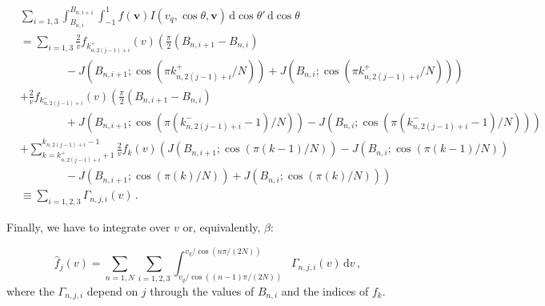 \begin{align*}
& \sum_{i = 1,3}\int_{B_{n,i}}^{B_{n,i+1}} \int_{-1}^{1} f(\textbf{v}) I(v_q, \cos\theta, \textbf{v}) \, \mathrm{d}\cos\theta' \, \mathrm{d}\cos\theta\\
&=\sum_{i = 1,3} \frac{2}{v} f_{k_{n,2(j-1)+i}^+}(v) \left( \frac{\pi}{2}(B_{n,i+1} - B_{n,i}) \right.\\
&\qquad\qquad - \left.J(B_{n,i+1}; \cos(\pi k_{n,2(j-1)+i}^{+}/N)) + J(B_{n,i}; \cos(\pi k_{n,2(j-1)+i}^{+}/N))\right)\\
&+ \frac{2}{v} f_{k_{n,2(j-1)+i}^-}(v) \left( \frac{\pi}{2}(B_{n,i+1} - B_{n,i})\right. \\
&\qquad\qquad + \left. J(B_{n,i+1}; \cos(\pi (k_{n,2(j-1)+i}^{-}-1)/N)) - J(B_{n,i}; \cos(\pi (k_{n,2(j-1)+i}^{-}-1)/N))\right)\\
&+ \sum_{k = k_{n,2(j-1)+i}^+ +1}^{k_{n,2(j-1)+i}-1} \frac{2}{v} f_{k}(v) \left( J(B_{n,i+1};\cos(\pi (k-1)/N)) - J(B_{n,i};\cos(\pi (k-1)/N))\right. \\
&\qquad\qquad - \left. J(B_{n,i+1};\cos(\pi (k)/N)) + J(B_{n,i};\cos(\pi (k)/N)) \right)\\
&\equiv \sum_{i=1,2,3} \Gamma_{n,j,i}(v)\,.
\end{align*}

Finally, we have to integrate over $v$ or, equivalently, $\beta$:

\begin{equation}
\hat{f}_j(v) = \sum_{n = 1,N} \sum_{i=1,2,3} \int_{v_q/\cos((n-1)\pi/(2N))}^{v_q/\cos(n\pi/(2N))}  \Gamma_{n,j,i}(v) \, \mathrm{d}v\,,
\end{equation}
where the $\Gamma_{n,j,i}$ depend on $j$ through the values of $B_{n,i}$ and the indices of $f_k$.

